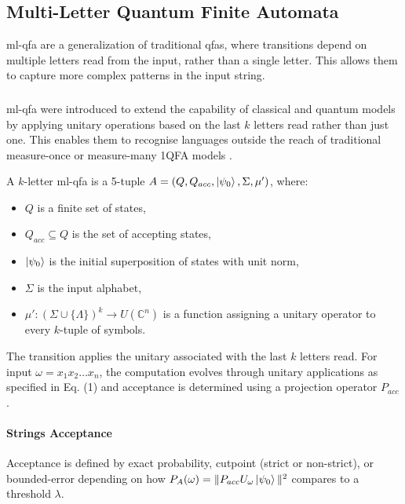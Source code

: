 \subsection{Multi-Letter Quantum Finite Automata}
\label{sec:multi-letter-qfa}

\gls{ml-qfa} are a generalization of traditional \glspl{qfa}, where transitions depend on multiple letters read from the input, rather than a single letter. This allows them to capture more complex patterns in the input string.

\subsubsection{}

\gls{ml-qfa} were introduced to extend the capability of classical and quantum models by applying unitary operations based on the last $k$ letters read rather than just one. This enables them to recognise languages outside the reach of traditional measure-once or measure-many 1QFA models \cite{belovs2007multi}.

\begin{definition}
A $k$-letter \gls{ml-qfa} is a 5-tuple $A = (Q, Q_{acc}, \ket{\psi_0}, \Sigma, \mu')$, where:
\begin{itemize}
    \item $Q$ is a finite set of states,
    \item $Q_{acc} \subseteq Q$ is the set of accepting states,
    \item $\ket{\psi_0}$ is the initial superposition of states with unit norm,
    \item $\Sigma$ is the input alphabet,
    \item $\mu': (\Sigma \cup \{\Lambda\})^k \to U(\mathbb{C}^n)$ is a function assigning a unitary operator to every $k$-tuple of symbols.
\end{itemize}
\end{definition}

The transition applies the unitary associated with the last $k$ letters read. For input $\omega = x_1 x_2 \dots x_n$, the computation evolves through unitary applications as specified in Eq. (1) and acceptance is determined using a projection operator $P_{acc}$ \cite{qiu2009hierarchy}.

\paragraph{Strings Acceptance}
Acceptance is defined by exact probability, cutpoint (strict or non-strict), or bounded-error depending on how $P_A(\omega) = \| P_{acc} U_\omega \ket{\psi_0} \|^2$ compares to a threshold $\lambda$.


